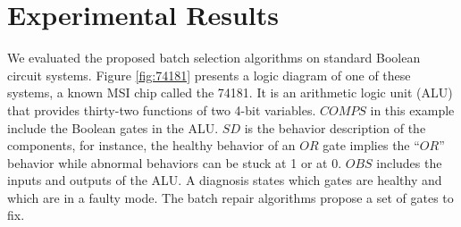 \documentclass[review]{elsarticle}
\newcommand{\COMPS}{\textit{COMPS}}
\newcommand{\SD}{\textit{SD}}
\newcommand{\OBS}{\textit{OBS}}
\begin{document}





\section{Experimental Results}

We evaluated the proposed batch selection algorithms on standard Boolean circuit systems. Figure \ref{fig:74181} presents a logic diagram of one of these systems, a known MSI chip called the 74181. It is an arithmetic logic unit (ALU) that provides thirty-two functions of two 4-bit variables. $\COMPS$ in this example include the Boolean gates in the ALU. $\SD$ is the behavior description of the components, for instance, the healthy behavior of an $\textit{OR}$ gate implies the ``$\textit{OR}$'' behavior while abnormal behaviors can be stuck at 1 or at 0. $\OBS$ includes the inputs and outputs of the ALU. A diagnosis states which gates are healthy and which are in a faulty mode. The batch repair algorithms propose a set of gates to fix.
\end{document}
